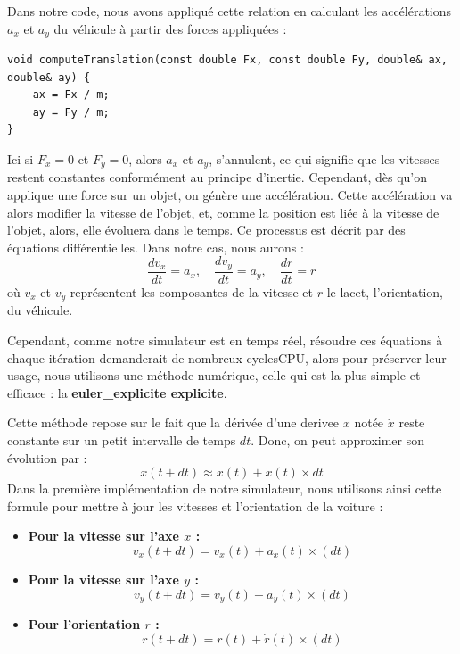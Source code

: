Dans notre code, nous avons appliqué cette relation en calculant les accélérations $a_x$ et $a_y$ du véhicule à partir des forces appliquées :


\begin{lstlisting}[style=CStyle,label={lst:void_computeTranslation}]
void computeTranslation(const double Fx, const double Fy, double& ax, double& ay) {
    ax = Fx / m;
    ay = Fy / m;
}
\end{lstlisting}

Ici si $F_x = 0$ et $F_y = 0$, alors $a_x$ et $a_y$, s'annulent, ce qui signifie que les vitesses restent constantes conformément au principe d'inertie.
Cependant, dès qu'on applique une force sur un objet, on génère une accélération.
Cette accélération va alors modifier la vitesse de l'objet, et, comme la position est liée à la vitesse de l'objet, alors, elle évoluera dans le temps.
Ce processus est décrit par des équations différentielles. Dans notre cas, nous aurons :
$$\frac{d v_x}{dt} = a_x, \quad \frac{d v_y}{dt} = a_y, \quad \frac{d r}{dt} = r_{\dot{}}$$
où $v_x$ et $v_y$ représentent les composantes de la vitesse et $r$ le lacet, l'orientation, du véhicule.

Cependant, comme notre simulateur est en temps réel, résoudre ces équations à chaque itération demanderait de nombreux \gls{cyclesCPU}, alors pour préserver leur usage, nous utilisons une méthode numérique, celle qui est la plus simple et efficace : la \textbf{\gls{euler_explicite} explicite}.

Cette méthode repose sur le fait que la dérivée d'une \gls{derivee} $x$ notée $\dot{x}$ reste constante sur un petit intervalle de temps $dt$.
Donc, on peut approximer son évolution par :
$$x(t+dt) \approx x(t) + \dot{x}(t) \times dt$$
Dans la première implémentation de notre simulateur, nous utilisons ainsi cette formule pour mettre à jour les vitesses et l'orientation de la voiture :
\\



\begin{itemize}
    \item \textbf{Pour la vitesse sur l'axe $x$ :}
    $$v_x(t+dt) = v_x(t)+a_x(t)\times(dt)$$
    \item \textbf{Pour la vitesse sur l'axe $y$ :}
    $$v_y(t+dt) = v_y(t)+a_y(t)\times(dt)$$
    \item \textbf{Pour l'orientation $r$ :}
    $$r(t+dt) = r(t)+\dot{r}(t)\times(dt)$$
\end{itemize}

